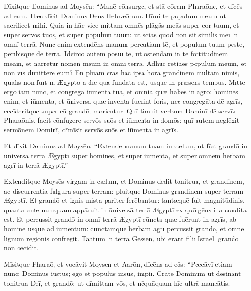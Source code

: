 Dīxitque Dominus ad Moysēn: ``Manē
cōnsurge, et stā cōram Pharaōne, et dīcēs ad eum:
Hæc dīcit Dominus Deus Hebræōrum: Dīmitte populum meum ut sacrificet
mihi.  Quia in hāc vice mittam omnēs 
plāgās meās super
cor tuum, et super servōs tuōs, et super populum tuum: ut sciās quod nōn
sit similis meī in omnī terrā.  Nunc enim extendēns manum percutiam tē,
et populum tuum peste, perībisque dē terrā.  Idcircō autem posuī tē, ut ostendam in tē fortitūdinem
meam, et nārrētur nōmen meum in omnī terrā.  Adhūc retinēs populum meum,
et nōn vīs dīmittere eum?  Ēn pluam crās hāc ipsā hōrā
grandinem multam nimis, quālis nōn fuit in Ægyptō ā diē quā
fundāta est, usque in præsēns tempus.  Mitte ergō iam nunc, et
congrega iūmenta tua, et omnia quæ habēs in agrō: hominēs
enim, et iūmenta, et ūniversa quæ inventa fuerint foris, nec
congregāta dē
agrīs, cecīderitque super eā grandō, morientur.  Quī
timuit verbum Dominī dē servīs Pharaōnis, facit cōnfugere
servōs suōs et iūmenta in domōs: quī autem neglēxit sermōnem Dominī,
dīmīsit servōs suōs et iūmenta in agrīs.

Et dīxit Dominus ad Moysēn: ``Extende manum tuam in cælum, ut fīat grandō in ūniversā terrā Ægyptī super
hominēs, et super iūmenta, et super omnem herbam agrī in terrā Ægyptī.''

Extenditque Moysēs virgam in cælum, et Dominus dedit
tonitrua, et grandinem, ac discurrentia
fulgura super terram: pluitque Dominus grandinem super
terram Ægyptī.  Et grandō et ignis mista
pariter ferēbantur: tantæquē fuit
magnitūdinis, quanta ante numquam appāruit in ūniversā
terrā Ægyptī ex quō gēns illa condita est.  Et percussit
grandō in omnī terrā Ægyptī cūncta quæ fuērunt in agrīs, ab homine usque ad
iūmentum: cūnctamque herbam agrī percussit grandō, et omne lignum regiōnis
cōnfrēgit.  Tantum in terrā Gessen, ubi erant fīliī
Isrāēl, grandō nōn cecidit.  

Mīsitque Pharaō, et vocāvit Moysen et Aarōn,
dīcēns ad eōs: ``Peccāvī etiam nunc: Dominus iūstus; ego
et populus meus, impiī.  Ōrāte Dominum ut dēsinant
tonitrua Deī, et grandō: ut dīmittam vōs, et nēquāquam hīc ultrā maneātis.

